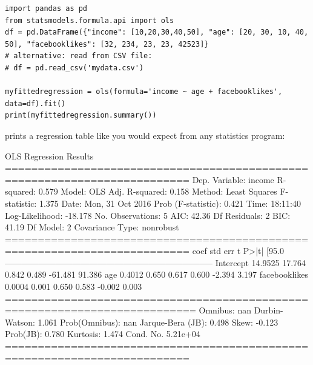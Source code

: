 \documentclass[a4paper,12pt]{book}
\begin{document}
\begin{lstlisting}
import pandas as pd
from statsmodels.formula.api import ols
df = pd.DataFrame({"income": [10,20,30,40,50], "age": [20, 30, 10, 40, 50], "facebooklikes": [32, 234, 23, 23, 42523]}
# alternative: read from CSV file:
# df = pd.read_csv('mydata.csv')

myfittedregression = ols(formula='income ~ age + facebooklikes', data=df).fit()
print(myfittedregression.summary())

\end{lstlisting}
prints a regression table like you would expect from any statistics program:

\begin{lstlistingoutput}
OLS Regression Results                            
==========================================================================
Dep. Variable:                 income   R-squared:                       0.579
Model:                            OLS   Adj. R-squared:                  0.158
Method:                 Least Squares   F-statistic:                     1.375
Date:                Mon, 31 Oct 2016   Prob (F-statistic):              0.421
Time:                        18:11:40   Log-Likelihood:                -18.178
No. Observations:                   5   AIC:                             42.36
Df Residuals:                       2   BIC:                             41.19
Df Model:                           2                                         
Covariance Type:            nonrobust                                         
==========================================================================
coef    std err          t      P>|t|      [95.0%
--------------------------------------------------------------------------
Intercept        14.9525     17.764      0.842      0.489       -61.481    91.386
age               0.4012      0.650      0.617      0.600        -2.394     3.197
facebooklikes     0.0004      0.001      0.650      0.583        -0.002     0.003
===========================================================================
Omnibus:                          nan   Durbin-Watson:                   1.061
Prob(Omnibus):                    nan   Jarque-Bera (JB):                0.498
Skew:                          -0.123   Prob(JB):                        0.780
Kurtosis:                       1.474   Cond. No.                     5.21e+04
==========================================================================
\end{lstlistingoutput}
\end{document}
